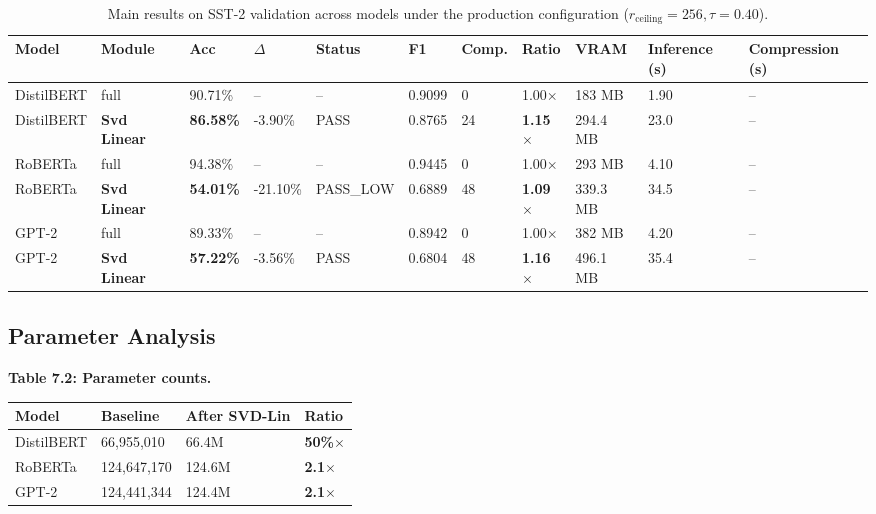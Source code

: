 \begin{table}[t]
\centering
\small
\begin{tabular}{lllllllllll}
\toprule
\textbf{Model} & \textbf{Module} & \textbf{Acc} & \textbf{$\Delta$} & \textbf{Status} & \textbf{F1} & \textbf{Comp.} & \textbf{Ratio} & \textbf{VRAM} & \textbf{Inference (s)} & \textbf{Compression (s)} \\
\midrule
DistilBERT & full & 90.71\% & -- & -- & 0.9099 & 0 & 1.00$\times$ & 183 MB & 1.90 & -- \\
DistilBERT & \textbf{Svd Linear} & \textbf{86.58\%} & -3.90\% & PASS & 0.8765 & 24 & \textbf{1.15$\times$} & 294.4 MB & 23.0 & -- \\
RoBERTa & full & 94.38\% & -- & -- & 0.9445 & 0 & 1.00$\times$ & 293 MB & 4.10 & -- \\
RoBERTa & \textbf{Svd Linear} & \textbf{54.01\%} & -21.10\% & PASS_LOW & 0.6889 & 48 & \textbf{1.09$\times$} & 339.3 MB & 34.5 & -- \\
GPT-2 & full & 89.33\% & -- & -- & 0.8942 & 0 & 1.00$\times$ & 382 MB & 4.20 & -- \\
GPT-2 & \textbf{Svd Linear} & \textbf{57.22\%} & -3.56\% & PASS & 0.6804 & 48 & \textbf{1.16$\times$} & 496.1 MB & 35.4 & -- \\
\bottomrule
\end{tabular}
\caption{Main results on SST-2 validation across models under the production configuration ($r_{\mathrm{ceiling}}=256, \tau=0.40$).}
\label{tab:main_sst2}
\end{table}

\subsection{Parameter Analysis}

\textbf{Table 7.2: Parameter counts.}

\begin{table}[H]
\centering
\small
\begin{tabular}{llll}
\toprule
\textbf{Model} & \textbf{Baseline} & \textbf{After SVD-Lin} & \textbf{Ratio} \\
\midrule
DistilBERT & 66,955,010 & 66.4M & \textbf{50\%$\times$} \\
RoBERTa & 124,647,170 & 124.6M & \textbf{2.1$\times$} \\
GPT-2 & 124,441,344 & 124.4M & \textbf{2.1$\times$} \\
\bottomrule
\end{tabular}
\end{table}

